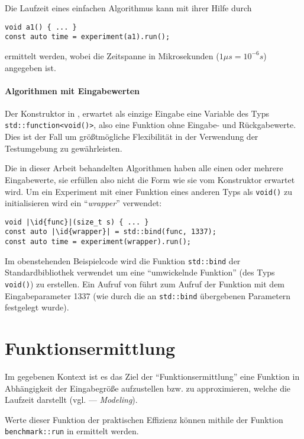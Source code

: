 Die Laufzeit eines einfachen Algorithmus kann mit ihrer Hilfe durch
\begin{lstlisting}[numbers=none]
void a1() { ... }
const auto time = experiment(a1).run();
\end{lstlisting}
ermittelt werden, wobei die Zeitspanne in Mikrosekunden ($1\mu s = 10^{-6} s$) angegeben ist.

\paragraph{Algorithmen mit Eingabewerten} Der Konstruktor in ,  erwartet als einzige Eingabe eine Variable des Typs \lstinline{std::function<void()>}, also eine Funktion ohne Eingabe- und Rückgabewerte. Dies ist der Fall um größtmögliche Flexibilität in der Verwendung der Testumgebung zu gewährleisten.

Die in dieser Arbeit behandelten Algorithmen haben alle einen oder mehrere Eingabewerte, sie erfüllen also nicht die Form wie sie vom Konstruktor erwartet wird. Um ein Experiment mit einer Funktion eines anderen Typs als \lstinline{void()} zu initialisieren wird ein \enquote{\emph{wrapper}} verwendet:

\begin{lstlisting}[numbers=none]
void |\id{func}|(size_t s) { ... }
const auto |\id{wrapper}| = std::bind(func, 1337);
const auto time = experiment(wrapper).run();
\end{lstlisting}

Im obenstehenden Beispielcode wird die Funktion \lstinline{std::bind} der Standardbibliothek verwendet um eine \enquote{umwickelnde Funktion}  (des Typs \lstinline{void()}) zu erstellen. Ein Aufruf von  führt zum Aufruf der Funktion  mit dem Eingabeparameter 1337 (wie durch die an \lstinline{std::bind} übergebenen Parametern festgelegt wurde).

\section{Funktionsermittlung}
\label{sec:funkterm}

Im gegebenen Kontext ist es das Ziel der \enquote{Funktionsermittlung} eine Funktion in Abhängigkeit der Eingabegröße aufzustellen bzw. zu approximieren, welche die Laufzeit darstellt (vgl. \cite[37]{mcg2012} --- \emph{Modeling}).

Werte dieser Funktion der praktischen Effizienz können mithile der Funktion \lstinline{benchmark::run} in  ermittelt werden.

